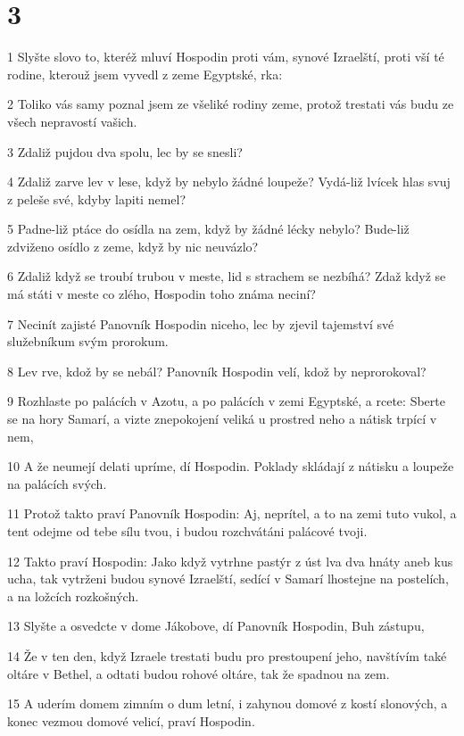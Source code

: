 \chapter{3}

\par 1 Slyšte slovo to, kteréž mluví Hospodin proti vám, synové Izraelští, proti vší té rodine, kterouž jsem vyvedl z zeme Egyptské, rka:
\par 2 Toliko vás samy poznal jsem ze všeliké rodiny zeme, protož trestati vás budu ze všech nepravostí vašich.
\par 3 Zdaliž pujdou dva spolu, lec by se snesli?
\par 4 Zdaliž zarve lev v lese, když by nebylo žádné loupeže? Vydá-liž lvícek hlas svuj z peleše své, kdyby lapiti nemel?
\par 5 Padne-liž ptáce do osídla na zem, když by žádné lécky nebylo? Bude-liž zdviženo osídlo z zeme, když by nic neuvázlo?
\par 6 Zdaliž když se troubí trubou v meste, lid s strachem se nezbíhá? Zdaž když se má státi v meste co zlého, Hospodin toho známa neciní?
\par 7 Necinít zajisté Panovník Hospodin niceho, lec by zjevil tajemství své služebníkum svým prorokum.
\par 8 Lev rve, kdož by se nebál? Panovník Hospodin velí, kdož by neprorokoval?
\par 9 Rozhlaste po palácích v Azotu, a po palácích v zemi Egyptské, a rcete: Sberte se na hory Samarí, a vizte znepokojení veliká u prostred neho a nátisk trpící v nem,
\par 10 A že neumejí delati upríme, dí Hospodin. Poklady skládají z nátisku a loupeže na palácích svých.
\par 11 Protož takto praví Panovník Hospodin: Aj, neprítel, a to na zemi tuto vukol, a tent odejme od tebe sílu tvou, i budou rozchvátáni palácové tvoji.
\par 12 Takto praví Hospodin: Jako když vytrhne pastýr z úst lva dva hnáty aneb kus ucha, tak vytrženi budou synové Izraelští, sedící v Samarí lhostejne na postelích, a na ložcích rozkošných.
\par 13 Slyšte a osvedcte v dome Jákobove, dí Panovník Hospodin, Buh zástupu,
\par 14 Že v ten den, když Izraele trestati budu pro prestoupení jeho, navštívím také oltáre v Bethel, a odtati budou rohové oltáre, tak že spadnou na zem.
\par 15 A uderím domem zimním o dum letní, i zahynou domové z kostí slonových, a konec vezmou domové velicí, praví Hospodin.

